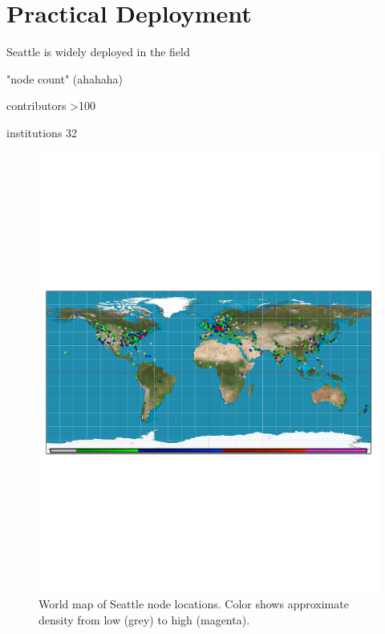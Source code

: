 \section{Practical Deployment}\label{sec-deployment}

Seattle is widely deployed in the field

"node count" (ahahaha)

contributors >100

institutions 32

\begin{figure}
  \centering
  \includegraphics[width=\columnwidth]{figures/finishedmap_ipinfo_small.pdf}
  \caption{World map of Seattle node locations. Color shows approximate density from low (grey) to high (magenta).}
  \label{fig:map}
\end{figure}
